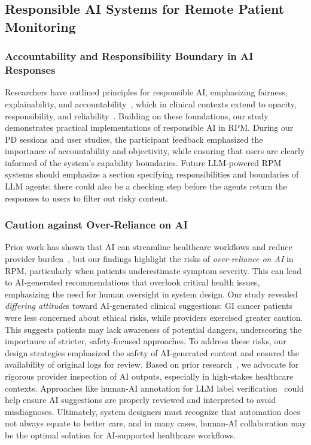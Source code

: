 \subsection{Responsible AI Systems for Remote Patient Monitoring}
\subsubsection{Accountability and Responsibility Boundary in AI Responses}
Researchers have outlined principles for responsible AI, emphasizing fairness, explainability, and accountability~\cite{dignum2019responsible, arrieta2020explainable}, which in clinical contexts extend to opacity, responsibility, and reliability~\cite{smith2021clinical}. 
Building on these foundations, our study demonstrates practical implementations of responsible AI in RPM. During our PD sessions and user studies, the participant feedback emphasized the importance of accountability and objectivity, while ensuring that users are clearly informed of the system’s capability boundaries. Future LLM-powered RPM systems should emphasize a section specifying responsibilities and boundaries of LLM agents; there could also be a checking step before the agents return the responses to users to filter out risky content.



\subsubsection{Caution against Over-Reliance on AI}

Prior work has shown that AI can streamline healthcare workflows and reduce provider burden~\cite{yildirimMultimodalHealthcareAI2024}, but our findings highlight the risks of \textit{over-reliance on AI} in RPM, particularly when patients underestimate symptom severity. This can lead to AI-generated recommendations that overlook critical health issues, emphasizing the need for human oversight in system design.
Our study revealed \textit{differing attitude}s toward AI-generated clinical suggestions: GI cancer patients were less concerned about ethical risks, while providers exercised greater caution. This suggests patients may lack awareness of potential dangers, underscoring the importance of stricter, safety-focused approaches. To address these risks, our design strategies emphasized the safety of AI-generated content and ensured the availability of original logs for review. Based on prior research~\cite{kerasidouTrustRelianceMedical2022}, we advocate for rigorous provider inspection of AI outputs, especially in high-stakes healthcare contexts. 
Approaches like human-AI annotation for LLM label verification~\cite{wang2024human} could help ensure AI suggestions are properly reviewed and interpreted to avoid misdiagnoses. Ultimately, system designers must recognize that automation does not always equate to better care, and in many cases, human-AI collaboration may be the optimal solution for AI-supported healthcare workflows.




